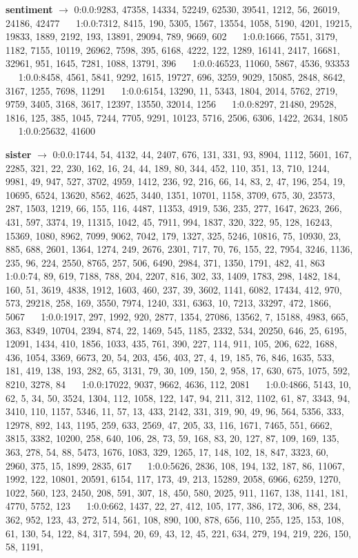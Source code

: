 \documentclass[a4paper,11pt,oneside]{book}
\begin{document}
\textbf{sentiment}  $\rightarrow$	0:0.0:9283, 47358, 14334, 52249, 62530, 39541, 1212, 56, 26019, 24186, 42477	$\quad$	1:0.0:7312, 8415, 190, 5305, 1567, 13554, 1058, 5190, 4201, 19215, 19833, 1889, 2192, 193, 13891, 29094, 789, 9669, 602	$\quad$	1:0.0:1666, 7551, 3179, 1182, 7155, 10119, 26962, 7598, 395, 6168, 4222, 122, 1289, 16141, 2417, 16681, 32961, 951, 1645, 7281, 1088, 13791, 396	$\quad$	1:0.0:46523, 11060, 5867, 4536, 93353	$\quad$	1:0.0:8458, 4561, 5841, 9292, 1615, 19727, 696, 3259, 9029, 15085, 2848, 8642, 3167, 1255, 7698, 11291	$\quad$	1:0.0:6154, 13290, 11, 5343, 1804, 2014, 5762, 2719, 9759, 3405, 3168, 3617, 12397, 13550, 32014, 1256	$\quad$	1:0.0:8297, 21480, 29528, 1816, 125, 385, 1045, 7244, 7705, 9291, 10123, 5716, 2506, 6306, 1422, 2634, 1805	$\quad$	1:0.0:25632, 41600	$\quad$	

\textbf{sister} $\rightarrow$		0:0.0:1744, 54, 4132, 44, 2407, 676, 131, 331, 93, 8904, 1112, 5601, 167, 2285, 321, 22, 230, 162, 16, 24, 44, 189, 80, 344, 452, 110, 351, 13, 710, 1244, 9981, 49, 947, 527, 3702, 4959, 1412, 236, 92, 216, 66, 14, 83, 2, 47, 196, 254, 19, 10695, 6524, 13620, 8562, 4625, 3440, 1351, 10701, 1158, 3709, 675, 30, 23573, 287, 1503, 1219, 66, 155, 116, 4487, 11353, 4919, 536, 235, 277, 1647, 2623, 266, 431, 597, 3374, 19, 11315, 1042, 45, 7911, 994, 1837, 320, 322, 95, 128, 16243, 15369, 1080, 8962, 7099, 9062, 7042, 179, 1327, 325, 5246, 10816, 75, 10930, 23, 885, 688, 2601, 1364, 1274, 249, 2676, 2301, 717, 70, 76, 155, 22, 7954, 3246, 1136, 235, 96, 224, 2550, 8765, 257, 506, 6490, 2984, 371, 1350, 1791, 482, 41, 863	$\quad$	1:0.0:74, 89, 619, 7188, 788, 204, 2207, 816, 302, 33, 1409, 1783, 298, 1482, 184, 160, 51, 3619, 4838, 1912, 1603, 460, 237, 39, 3602, 1141, 6082, 17434, 412, 970, 573, 29218, 258, 169, 3550, 7974, 1240, 331, 6363, 10, 7213, 33297, 472, 1866, 5067	$\quad$	1:0.0:1917, 297, 1992, 920, 2877, 1354, 27086, 13562, 7, 15188, 4983, 665, 363, 8349, 10704, 2394, 874, 22, 1469, 545, 1185, 2332, 534, 20250, 646, 25, 6195, 12091, 1434, 410, 1856, 1033, 435, 761, 390, 227, 114, 911, 105, 206, 622, 1688, 436, 1054, 3369, 6673, 20, 54, 203, 456, 403, 27, 4, 19, 185, 76, 846, 1635, 533, 181, 419, 138, 193, 282, 65, 3131, 79, 30, 109, 150, 2, 958, 17, 630, 675, 1075, 592, 8210, 3278, 84	$\quad$	1:0.0:17022, 9037, 9662, 4636, 112, 2081	$\quad$	1:0.0:4866, 5143, 10, 62, 5, 34, 50, 3524, 1304, 112, 1058, 122, 147, 94, 211, 312, 1102, 61, 87, 3343, 94, 3410, 110, 1157, 5346, 11, 57, 13, 433, 2142, 331, 319, 90, 49, 96, 564, 5356, 333, 12978, 892, 143, 1195, 259, 633, 2569, 47, 205, 33, 116, 1671, 7465, 551, 6662, 3815, 3382, 10200, 258, 640, 106, 28, 73, 59, 168, 83, 20, 127, 87, 109, 169, 135, 363, 278, 54, 88, 5473, 1676, 1083, 329, 1265, 17, 148, 102, 18, 847, 3323, 60, 2960, 375, 15, 1899, 2835, 617	$\quad$	1:0.0:5626, 2836, 108, 194, 132, 187, 86, 11067, 1992, 122, 10801, 20591, 6154, 117, 173, 49, 213, 15289, 2058, 6966, 6259, 1270, 1022, 560, 123, 2450, 208, 591, 307, 18, 450, 580, 2025, 911, 1167, 138, 1141, 181, 4770, 5752, 123	$\quad$	1:0.0:662, 1437, 22, 27, 412, 105, 177, 386, 172, 306, 88, 234, 362, 952, 123, 43, 272, 514, 561, 108, 890, 100, 878, 656, 110, 255, 125, 153, 108, 61, 130, 54, 122, 84, 317, 594, 20, 69, 43, 12, 45, 221, 634, 279, 194, 219, 226, 150, 58, 1191, 
\end{document}
